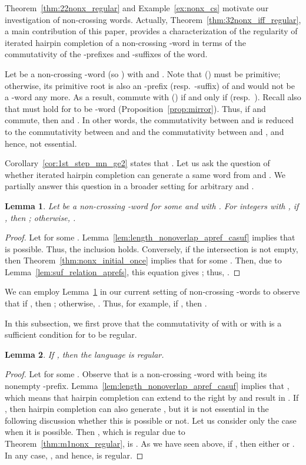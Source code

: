 \documentclass{article}
\theoremstyle{plain}
\newtheorem{lemma}{Lemma}
\theoremstyle{remark}
\begin{document}
Theorem~\ref{thm:22nonx_regular} and Example~\ref{ex:nonx_cs} motivate our investigation of non-crossing  words. 
Actually, Theorem~\ref{thm:32nonx_iff_regular}, a main contribution of this paper, provides a characterization of the regularity of iterated hairpin completion of a non-crossing -word in terms of the commutativity of the -prefixes and -suffixes of the word. 

Let  be a non-crossing -word (so ) with  and . 
Note that  () must be primitive; otherwise, its primitive root is also an -prefix (resp.~-suffix) of  and  would not be a -word any more. 
As a result,  commute with  () if and only if  (resp.~). 
Recall also that  must hold for  to be -word (Proposition~\ref{prop:mirror}).
Thus, if  and  commute, then  and . 
In other words, the commutativity between  and  is reduced to the commutativity between  and  and the commutativity between  and , and hence, not essential. 

Corollary~\ref{cor:1st_step_mn_ge2} states that . 
Let us ask the question of whether iterated hairpin completion can generate a same word from  and . 
We partially answer this question in a broader setting for arbitrary  and . 

\begin{lemma}\label{lem:mn_nonx_include_or_emptyset}
	Let  be a non-crossing -word for some  and  with . 
	For integers  with , if , then ; otherwise, . 
\end{lemma}
\begin{proof}
	Let  for some .
	Lemma~\ref{lem:length_nonoverlap_apref_casuf} implies that  is possible. 
	Thus, the inclusion holds. 
	Conversely, if the intersection is not empty, then Theorem~\ref{thm:nonx_initial_once} implies that  for some . 
	Then, due to Lemma~\ref{lem:suf_relation_aprefs}, this equation gives ; thus, . 
\end{proof}



We can employ Lemma~\ref{lem:mn_nonx_include_or_emptyset} in our current setting of non-crossing -words to observe that if , then ; otherwise, . 
Thus, for example, if , then . 

In this subsection, we first prove that the commutativity of  with  or with  is a sufficient condition for  to be regular. 

\begin{lemma}\label{lem:22nonx_u2isv2_regular}
	If , then the language  is regular. 
\end{lemma}
\begin{proof}
	Let  for some . 
	Observe that  is a non-crossing -word with  being its nonempty -prefix. 
	Lemma~\ref{lem:length_nonoverlap_apref_casuf} implies that , which means that hairpin completion can extend  to the right by  and result in . 
	If , then hairpin completion can also generate , but it is not essential in the following discussion whether this is possible or not. 
	Let us consider only the case when it is possible. 
	Then , which is regular due to Theorem~\ref{thm:m1nonx_regular}, is . 
	As we have seen above, if , then either  or . 
	In any case, , and hence, is regular. 
\end{proof}
\end{document}
